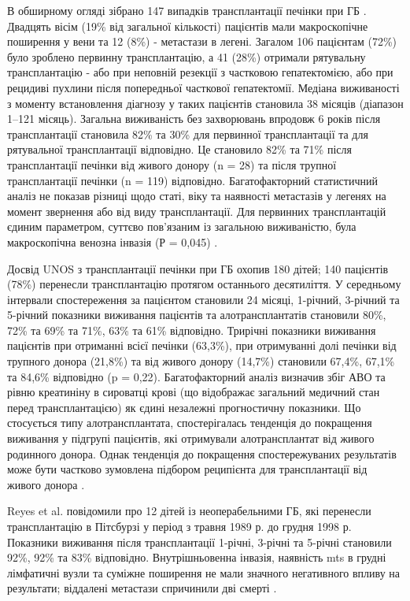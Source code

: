 В обширному огляді зібрано 147 випадків трансплантації печінки при ГБ \cite{pmid17208562}. Двадцять вісім (19\% від загальної кількості) пацієнтів мали макроскопічне поширення у вени та 12 (8\%) - метастази в легені. Загалом 106 пацієнтам (72\%) було зроблено первинну трансплантацію, а 41 (28\%) отримали рятувальну трансплантацію - або при неповній резекції з частковою гепатектомією, або при рецидиві пухлини після попередньої часткової гепатектомії. Медіана виживаності з моменту встановлення діагнозу у таких пацієнтів становила 38 місяців (діапазон 1–121 місяць). Загальна виживаність без захворювань впродовж 6 років після трансплантації становила 82\% та 30\% для первинної трансплантації та для рятувальної трансплантації відповідно. Це становило 82\% та 71\% після трансплантації печінки від живого донору (n = 28) та після трупної трансплантації печінки (n = 119) відповідно. Багатофакторний статистичний аналіз не показав різниці щодо статі, віку та наявності метастазів у легенях на момент звернення або від виду трансплантації. Для первинних трансплантацій єдиним параметром, суттєво пов’язаним із загальною виживаністю, була макроскопічна венозна інвазія (Р = 0,045) \cite{pmid22648963}.

Досвід UNOS з трансплантації печінки при ГБ охопив 180 дітей; 140 пацієнтів (78\%) перенесли трансплантацію протягом останнього десятиліття. У середньому інтервали спостереження за пацієнтом становили 24 місяці, 1-річний, 3-річний та 5-річний показники виживання пацієнтів та алотрансплантатів становили 80\%, 72\% та 69\% та 71\%, 63\% та 61\% відповідно. Трирічні показники виживання пацієнтів при отриманні всієї печінки (63,3\%), при отримуванні долі печінки від трупного донора (21,8\%) та від живого донору (14,7\%) становили 67,4\%, 67,1\% та 84,6\% відповідно (p = 0,22). Багатофакторний аналіз визначив збіг АВО та рівню креатиніну в сироватці крові (що відображає загальний медичний стан перед трансплантацією) як єдині незалежні прогностичну показники. Що стосується типу алотрансплантата, спостерігалась тенденція до покращення виживання у підгрупі пацієнтів, які отримували алотрансплантат від живого родинного донора. Однак тенденція до покращення спостережуваних результатів може бути частково зумовлена підбором реципієнта  для трансплантації від живого донора \cite{pmid32843604}.

Reyes et al. повідомили про 12 дітей із неоперабельними ГБ, які перенесли трансплантацію в Пітсбурзі у період з травня 1989 р. до грудня 1998 р. Показники виживання після трансплантації  1-річні, 3-річні та 5-річні становили 92\%, 92\% та 83\% відповідно. Внутрішньовенна інвазія, наявність mts в грудні лімфатичні вузли та суміжне поширення не мали значного негативного впливу на результати; віддалені метастази спричинили дві смерті \cite{pmid20345611}.

